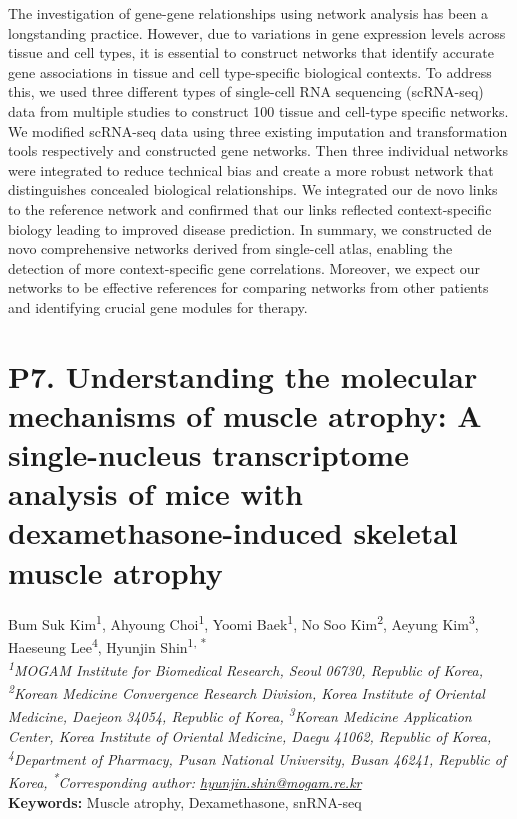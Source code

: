 \noindent
The investigation of gene-gene relationships using network analysis has been a longstanding practice. However, due to variations in gene expression levels across tissue and cell types, it is essential to construct networks that identify accurate gene associations in tissue and cell type-specific biological contexts. To address this, we used three different types of single-cell RNA sequencing (scRNA-seq) data from multiple studies to construct 100 tissue and cell-type specific networks. We modified scRNA-seq data using three existing imputation and transformation tools respectively and constructed gene networks. Then three individual networks were integrated to reduce technical bias and create a more robust network that distinguishes concealed biological relationships. We integrated our de novo links to the reference network and confirmed that our links reflected context-specific biology leading to improved disease prediction. In summary, we constructed de novo comprehensive networks derived from single-cell atlas, enabling the detection of more context-specific gene correlations. Moreover, we expect our networks to be effective references for comparing networks from other patients and identifying crucial gene modules for therapy.
\newpage


\section*{P7. Understanding the molecular mechanisms of muscle atrophy: A single-nucleus transcriptome analysis of mice with dexamethasone-induced skeletal muscle atrophy}

\begin{center}
Bum Suk Kim\href{https://orcid.org/0000-0001-6528-7354}{\textcolor{orcidlogocol}{\aiOrcid}}\textsuperscript{1}, Ahyoung Choi\textsuperscript{1}, Yoomi Baek\textsuperscript{1}, No Soo Kim\textsuperscript{2}, Aeyung Kim\textsuperscript{3}, Haeseung Lee\textsuperscript{4}, Hyunjin Shin\textsuperscript{1, *} \\
\vspace{0.2cm}
\textit{\textsuperscript{1}MOGAM Institute for Biomedical Research, Seoul 06730, Republic of Korea, \textsuperscript{2}Korean Medicine Convergence Research Division, Korea Institute of Oriental Medicine, Daejeon 34054, Republic of Korea, \textsuperscript{3}Korean Medicine Application Center, Korea Institute of Oriental Medicine, Daegu 41062, Republic of Korea, \textsuperscript{4}Department of Pharmacy, Pusan National University, Busan 46241, Republic of Korea, \textsuperscript{*}Corresponding author: \href{mailto:hyunjin.shin@mogam.re.kr}{hyunjin.shin@mogam.re.kr}} \\
\vspace{0.2cm}
\textbf{Keywords:} Muscle atrophy, Dexamethasone, snRNA-seq
\end{center}

